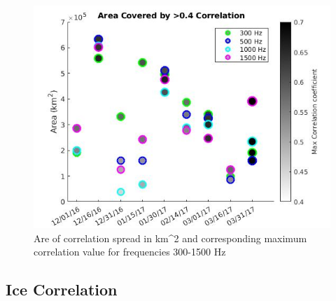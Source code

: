 \begin{figure}[h]
\centering
\includegraphics[scale=0.5]{Figures/area_cov_time_corrr.jpg}
\caption{Are of correlation spread in km^{2} and corresponding maximum correlation value for frequencies 300-1500 Hz}
\label{fig_maxcorr_dist}
\end{figure}

\subsection{Ice Correlation}

